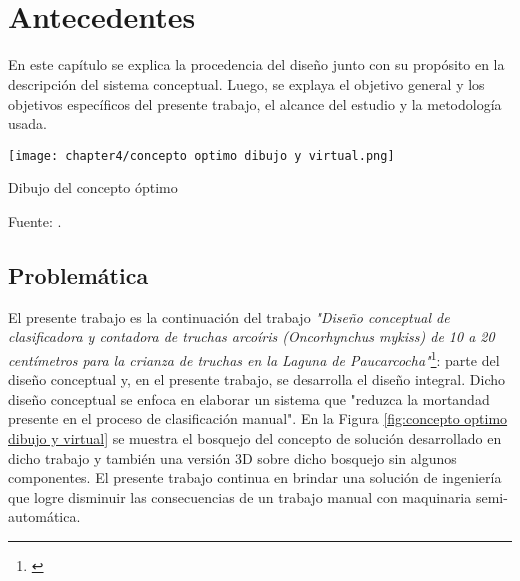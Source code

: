 
\pagestyle{myportland}
\doublespacing
\chapter[\quad\quad\quad\quad ----- Antecedentes]{\\Antecedentes}
\thispagestyle{myportland}

En este capítulo se explica la procedencia del diseño junto con su propósito en la descripción del sistema conceptual. Luego, se explaya el objetivo general y los objetivos específicos del presente trabajo, el alcance del estudio y la metodología usada.


\begin{myfigure}[H]
	\centering
	\texttt{[image: chapter4/concepto optimo dibujo y virtual.png]}
	\caption{Dibujo del concepto óptimo}
	\begin{myflushcenter}
		Fuente: \cite{DiazVergara2020}.
	\end{myflushcenter}
	\label{fig:concepto optimo dibujo y virtual}
\end{myfigure}

\vspace{-2.0em}

\section{Problemática}

El presente trabajo es la continuación del trabajo \textit{"Diseño conceptual de clasificadora y contadora de truchas arcoíris (Oncorhynchus mykiss) de 10 a 20 centímetros para la crianza de truchas en la Laguna de Paucarcocha"}\footnote{\cite{DiazVergara2020}}: parte del diseño conceptual y, en el presente trabajo, se desarrolla el diseño integral. Dicho diseño conceptual se enfoca en elaborar un sistema que "reduzca la mortandad presente en el proceso de clasificación manual". En la Figura \ref{fig:concepto optimo dibujo y virtual} se muestra el bosquejo del concepto de solución desarrollado en dicho trabajo y también una versión 3D sobre dicho bosquejo sin algunos componentes. El presente trabajo continua en brindar una solución de ingeniería que logre disminuir las consecuencias de un trabajo manual con maquinaria semi-automática.


